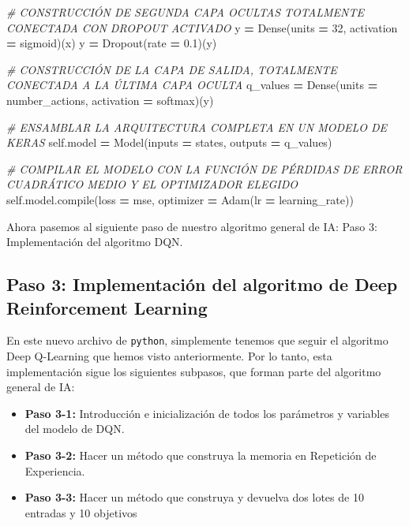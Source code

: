 \documentclass[
]{book}
\newenvironment{Shaded}{\begin{snugshade}}{\end{snugshade}}
\newcommand{\BuiltInTok}[1]{#1}
\newcommand{\CommentTok}[1]{\textcolor[rgb]{0.56,0.35,0.01}{\textit{#1}}}
\newcommand{\DecValTok}[1]{\textcolor[rgb]{0.00,0.00,0.81}{#1}}
\newcommand{\FloatTok}[1]{\textcolor[rgb]{0.00,0.00,0.81}{#1}}
\newcommand{\NormalTok}[1]{#1}
\newcommand{\OperatorTok}[1]{\textcolor[rgb]{0.81,0.36,0.00}{\textbf{#1}}}
\newcommand{\StringTok}[1]{\textcolor[rgb]{0.31,0.60,0.02}{#1}}
\newcommand{\VariableTok}[1]{\textcolor[rgb]{0.00,0.00,0.00}{#1}}
\providecommand{\tightlist}{%
  \setlength{\itemsep}{0pt}\setlength{\parskip}{0pt}}
\begin{document}
\begin{Shaded}
\begin{Highlighting}[]
        \CommentTok{\# CONSTRUCCIÓN DE SEGUNDA CAPA OCULTAS TOTALMENTE CONECTADA CON DROPOUT ACTIVADO}
\NormalTok{        y }\OperatorTok{=}\NormalTok{ Dense(units }\OperatorTok{=} \DecValTok{32}\NormalTok{, activation }\OperatorTok{=} \StringTok{\textquotesingle{}sigmoid\textquotesingle{}}\NormalTok{)(x)}
\NormalTok{        y }\OperatorTok{=}\NormalTok{ Dropout(rate }\OperatorTok{=} \FloatTok{0.1}\NormalTok{)(y)}

        \CommentTok{\# CONSTRUCCIÓN DE LA CAPA DE SALIDA, TOTALMENTE CONECTADA A LA ÚLTIMA CAPA OCULTA}
\NormalTok{        q\_values }\OperatorTok{=}\NormalTok{ Dense(units }\OperatorTok{=}\NormalTok{ number\_actions, activation }\OperatorTok{=} \StringTok{\textquotesingle{}softmax\textquotesingle{}}\NormalTok{)(y)}
        
        \CommentTok{\# ENSAMBLAR LA ARQUITECTURA COMPLETA EN UN MODELO DE KERAS}
        \VariableTok{self}\NormalTok{.model }\OperatorTok{=}\NormalTok{ Model(inputs }\OperatorTok{=}\NormalTok{ states, outputs }\OperatorTok{=}\NormalTok{ q\_values)}
        
        \CommentTok{\# COMPILAR EL MODELO CON LA FUNCIÓN DE PÉRDIDAS DE ERROR CUADRÁTICO MEDIO Y EL OPTIMIZADOR ELEGIDO}
        \VariableTok{self}\NormalTok{.model.}\BuiltInTok{compile}\NormalTok{(loss }\OperatorTok{=} \StringTok{\textquotesingle{}mse\textquotesingle{}}\NormalTok{, optimizer }\OperatorTok{=}\NormalTok{ Adam(lr }\OperatorTok{=}\NormalTok{ learning\_rate))}
\end{Highlighting}
\end{Shaded}

Ahora pasemos al siguiente paso de nuestro algoritmo general de IA: Paso 3: Implementación del algoritmo DQN.

\hypertarget{paso-3-implementaciuxf3n-del-algoritmo-de-deep-reinforcement-learning}{%
\subsection{Paso 3: Implementación del algoritmo de Deep Reinforcement Learning}\label{paso-3-implementaciuxf3n-del-algoritmo-de-deep-reinforcement-learning}}

En este nuevo archivo de \texttt{python}, simplemente tenemos que seguir el algoritmo Deep Q-Learning que hemos visto anteriormente. Por lo tanto, esta implementación sigue los siguientes subpasos, que forman parte del algoritmo general de IA:

\begin{itemize}
\tightlist
\item
  \textbf{Paso 3-1:} Introducción e inicialización de todos los parámetros y variables del modelo de DQN.
\item
  \textbf{Paso 3-2:} Hacer un método que construya la memoria en Repetición de Experiencia.
\item
  \textbf{Paso 3-3:} Hacer un método que construya y devuelva dos lotes de 10 entradas y 10 objetivos
\end{itemize}
\end{document}
